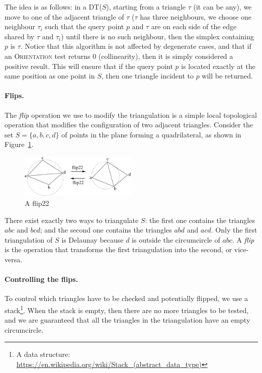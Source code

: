 The idea is as follows: in a DT($S$), starting from a triangle $\tau$ (it can be any), we move to one of the adjacent triangle of $\tau$ ($\tau$ has three neighbours, we choose one neighbour $\tau_i$ such that the query point $p$ and $\tau$ are on each side of the edge shared by $\tau$ and $\tau_i$) until there is no such neighbour, then the simplex containing $p$ is $\tau$.
Notice that this algorithm is not affected by degenerate cases, and that if an \textrm{O}\textsc{rientation} test returns 0 (collinearity), then it is simply considered a positive result. 
This will ensure that if the query point $p$ is located exactly at the same position as one point in $S$, then one triangle incident to $p$ will be returned.


\paragraph{Flips.}The \emph{flip} operation we use to modify the triangulation is a simple local topological operation that modifies the configuration of two adjacent triangles. 
Consider the set $S = \{a, b, c, d\}$ of points in the plane forming a quadrilateral, as shown in Figure~\ref{p:flip22}. 
\begin{figure}
  \centering
  \includegraphics[width=0.5\textwidth]{figs/flip22}
  \caption{A flip22}
\label{p:flip22}
\end{figure}
There exist exactly two ways to triangulate $S$: the first one contains the triangles $abc$ and $bcd$; and the second one contains the triangles $abd$ and $acd$. 
Only the first triangulation of $S$ is Delaunay because $d$ is outside the circumcircle of $abc$. 
A \emph{flip} is the operation that transforms the first triangulation into the second, or vice-versa.


\paragraph{Controlling the flips.}
To control which triangles have to be checked and potentially flipped, we use a stack\footnote{A data structure: \url{https://en.wikipedia.org/wiki/Stack_(abstract_data_type)}}. 
When the stack is empty, then there are no more triangles to be tested, and we are guaranteed that all the triangles in the triangulation have an empty circumcircle.


